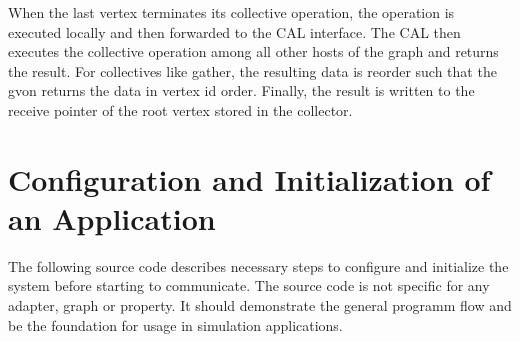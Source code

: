 When the last vertex terminates its collective operation, the
operation is executed locally and then forwarded to the CAL
interface. The CAL then executes the collective operation among all
other hosts of the graph and returns the result. For collectives like
gather, the resulting data is reorder such that the gvon returns the
data in vertex id order. Finally, the result is written to the receive
pointer of the root vertex stored in the collector.


\section{Configuration and Initialization of an Application}
The following source code describes necessary steps to configure and
initialize the system before starting to communicate. The source code
is not specific for any adapter, graph or property. It should
demonstrate the general programm flow and be the foundation for usage
in simulation applications.

